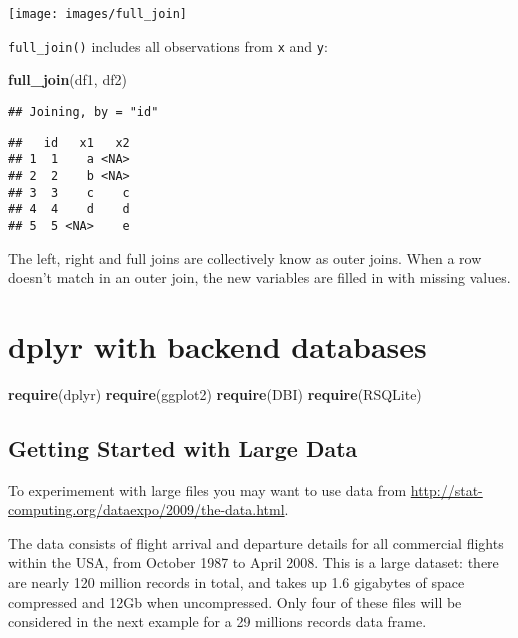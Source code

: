 \documentclass[]{book}
\newenvironment{Shaded}{\begin{snugshade}}{\end{snugshade}}
\newcommand{\KeywordTok}[1]{\textcolor[rgb]{0.13,0.29,0.53}{\textbf{{#1}}}}
\newcommand{\NormalTok}[1]{{#1}}
\begin{document}
\texttt{[image: images/full\_join]}

\texttt{full\_join()} includes all observations from \texttt{x} and
\texttt{y}:

\begin{Shaded}
\begin{Highlighting}[]
\KeywordTok{full_join}\NormalTok{(df1, df2)}
\end{Highlighting}
\end{Shaded}

\begin{verbatim}
## Joining, by = "id"
\end{verbatim}

\begin{verbatim}
##   id   x1   x2
## 1  1    a <NA>
## 2  2    b <NA>
## 3  3    c    c
## 4  4    d    d
## 5  5 <NA>    e
\end{verbatim}

The left, right and full joins are collectively know as outer joins.
When a row doesn't match in an outer join, the new variables are filled
in with missing values.

\clearpage

\section{dplyr with backend
databases}\label{dplyr-with-backend-databases}

\begin{Shaded}
\begin{Highlighting}[]
\KeywordTok{require}\NormalTok{(dplyr)}
\KeywordTok{require}\NormalTok{(ggplot2)}
\KeywordTok{require}\NormalTok{(DBI)}
\KeywordTok{require}\NormalTok{(RSQLite)}
\end{Highlighting}
\end{Shaded}

\subsection{Getting Started with Large
Data}\label{getting-started-with-large-data}

To experimement with large files you may want to use data from
\url{http://stat-computing.org/dataexpo/2009/the-data.html}.

The data consists of flight arrival and departure details for all
commercial flights within the USA, from October 1987 to April 2008. This
is a large dataset: there are nearly 120 million records in total, and
takes up 1.6 gigabytes of space compressed and 12Gb when uncompressed.
Only four of these files will be considered in the next example for a 29
millions records data frame.
\end{document}
